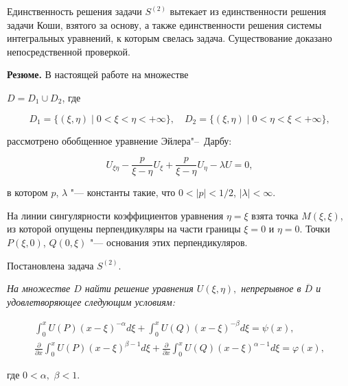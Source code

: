 Единственность решения задачи $S^{(2)}$ вытекает из единственности решения задачи Коши, взятого за основу, а также единственности решения системы интегральных уравнений, к которым свелась задача. Существование доказано непосредственной проверкой.



\smallskip



{\bf Резюме.} В настоящей работе  на множестве

$D=D_1\cup D_2$, где 

$$D_1=\{(\xi,\eta)\mid 0<\xi<\eta<+\infty\},\quad 

D_2=\{(\xi,\eta)\mid 0<\eta<\xi<+\infty\},$$

рассмотрено обобщенное уравнение Эйлера"--~Дарбу:

$$ 

U_{\xi\eta}- \frac{p}{\xi-\eta} U_{\xi} + \frac{p}{\xi-\eta} U_{\eta} - \lambda U =0,

$$

в котором $p$, $\lambda$ "--- константы такие, что $0<|p|<{1}/{2}$, $|\lambda|<\infty$.

На линии сингулярности коэффициентов уравнения $\eta=\xi$ взята точка $M(\xi,\xi)$, из которой опущены перпендикуляры на части границы $\xi=0$ и $\eta=0$. Точки $P(\xi, 0)$, $Q(0, \xi)$ "--- основания этих перпендикуляров.



Постановлена задача $S^{(2)}$. {\it  На множестве $D$ найти решение уравнения $U(\xi,\eta),$ непрерывное в $\overline{D}$ и удовлетворяющее следующим условиям{\rm:}

\begin{gather}

\int _0^x U(P) (x-\xi)^{-\alpha} d\xi +  \int _0^x U(Q) (x-\xi)^{-\beta} d\xi = \psi(x),

\\



\frac{\partial}{\partial x}\int _0^x U(P) (x-\xi)^{\beta-1} d\xi +  \frac{\partial}{\partial x}\int _0^x U(Q) (x-\xi)^{\alpha-1} d\xi = \varphi(x),

\end{gather}

где $0<\alpha,$ $\beta <1.$

}



